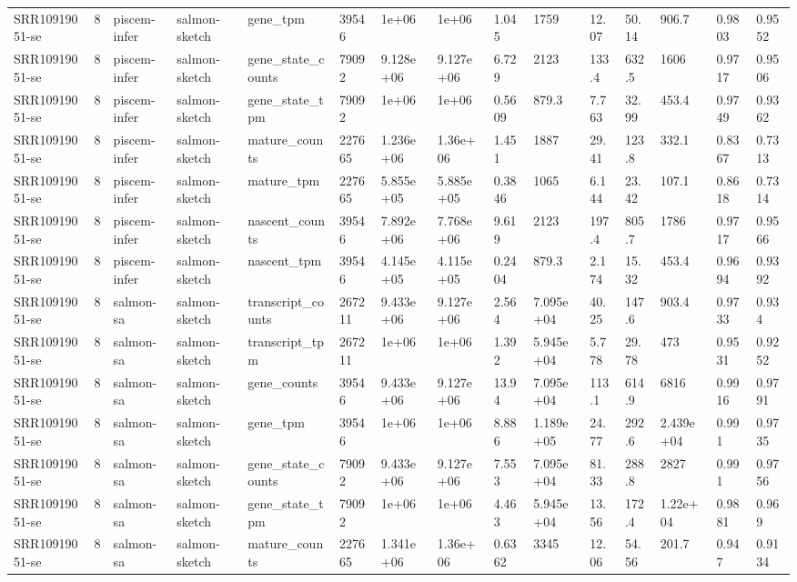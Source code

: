 \begin{tabular}{lllllllllllllll}
SRR10919051-se & 8 & piscem-infer & salmon-sketch & gene\_tpm & 39546 & 1e+06 & 1e+06 & 1.045 & 1759 & 12.07 & 50.14 & 906.7 & 0.9803 & 0.9552 \\
SRR10919051-se & 8 & piscem-infer & salmon-sketch & gene\_state\_counts & 79092 & 9.128e+06 & 9.127e+06 & 6.729 & 2123 & 133.4 & 632.5 & 1606 & 0.9717 & 0.9506 \\
SRR10919051-se & 8 & piscem-infer & salmon-sketch & gene\_state\_tpm & 79092 & 1e+06 & 1e+06 & 0.5609 & 879.3 & 7.763 & 32.99 & 453.4 & 0.9749 & 0.9362 \\
SRR10919051-se & 8 & piscem-infer & salmon-sketch & mature\_counts & 227665 & 1.236e+06 & 1.36e+06 & 1.451 & 1887 & 29.41 & 123.8 & 332.1 & 0.8367 & 0.7313 \\
SRR10919051-se & 8 & piscem-infer & salmon-sketch & mature\_tpm & 227665 & 5.855e+05 & 5.885e+05 & 0.3846 & 1065 & 6.144 & 23.42 & 107.1 & 0.8618 & 0.7314 \\
SRR10919051-se & 8 & piscem-infer & salmon-sketch & nascent\_counts & 39546 & 7.892e+06 & 7.768e+06 & 9.619 & 2123 & 197.4 & 805.7 & 1786 & 0.9717 & 0.9566 \\
SRR10919051-se & 8 & piscem-infer & salmon-sketch & nascent\_tpm & 39546 & 4.145e+05 & 4.115e+05 & 0.2404 & 879.3 & 2.174 & 15.32 & 453.4 & 0.9694 & 0.9392 \\
SRR10919051-se & 8 & salmon-sa & salmon-sketch & transcript\_counts & 267211 & 9.433e+06 & 9.127e+06 & 2.564 & 7.095e+04 & 40.25 & 147.6 & 903.4 & 0.9733 & 0.934 \\
SRR10919051-se & 8 & salmon-sa & salmon-sketch & transcript\_tpm & 267211 & 1e+06 & 1e+06 & 1.392 & 5.945e+04 & 5.778 & 29.78 & 473 & 0.9531 & 0.9252 \\
SRR10919051-se & 8 & salmon-sa & salmon-sketch & gene\_counts & 39546 & 9.433e+06 & 9.127e+06 & 13.94 & 7.095e+04 & 113.1 & 614.9 & 6816 & 0.9916 & 0.9791 \\
SRR10919051-se & 8 & salmon-sa & salmon-sketch & gene\_tpm & 39546 & 1e+06 & 1e+06 & 8.886 & 1.189e+05 & 24.77 & 292.6 & 2.439e+04 & 0.991 & 0.9735 \\
SRR10919051-se & 8 & salmon-sa & salmon-sketch & gene\_state\_counts & 79092 & 9.433e+06 & 9.127e+06 & 7.553 & 7.095e+04 & 81.33 & 288.8 & 2827 & 0.991 & 0.9756 \\
SRR10919051-se & 8 & salmon-sa & salmon-sketch & gene\_state\_tpm & 79092 & 1e+06 & 1e+06 & 4.463 & 5.945e+04 & 13.56 & 172.4 & 1.22e+04 & 0.9881 & 0.969 \\
SRR10919051-se & 8 & salmon-sa & salmon-sketch & mature\_counts & 227665 & 1.341e+06 & 1.36e+06 & 0.6362 & 3345 & 12.06 & 54.56 & 201.7 & 0.947 & 0.9134 \\

\end{tabular}
